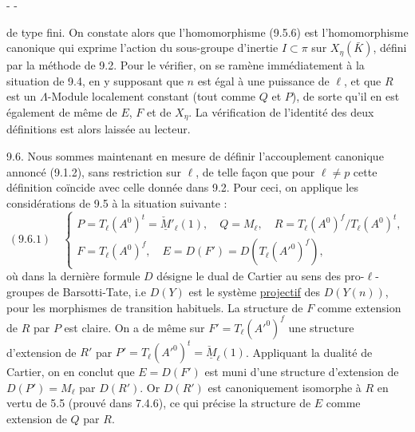 \begin{center}-  -\end{center}

de type fini. On constate alors que l'homomorphisme (9.5.6) est l'homomorphisme canonique qui exprime l'action du sous-groupe d'inertie $I\subset\pi$ sur $X_\eta(\bar K)$, défini par la méthode de 9.2. Pour le vérifier, on se ramène immédiatement à la situation de 9.4, en y supposant que $n$ est égal à une puissance de $\ell$, et que $R$ est un $\Lambda$-Module localement constant (tout comme $Q$ et $P$), de sorte qu'il en est également de même de $E$, $F$ et de $X_\eta$. La vérification de l'identité des deux définitions est alors laissée au lecteur.

9.6. Nous sommes maintenant en mesure de définir l'accouplement canonique annoncé (9.1.2), sans restriction sur $\ell$, de telle façon que pour $\ell\neq p$ cette définition coïncide avec celle donnée dans 9.2. Pour ceci, on applique les considérations de 9.5 à la situation suivante :
\[
(9.6.1)\quad\left\{\begin{array}{l}
P=T_\ell(A^0)^t=\check{\underline M}'_\ell(1),\quad Q=M_\ell,\quad R=T_\ell(A^0)^f/T_\ell(A^0)^t,\\[2em]
F=T_\ell(A^0)^f,\quad E=D(F')=D(T_\ell(A'^0)^f),
\end{array}\right.
\]
où dans la dernière formule $D$ désigne le dual de Cartier au sens des pro-$\ell$-groupes de Barsotti-Tate, i.e $D(Y)$ est le système \uline{projectif} des $D(Y(n))$, pour les morphismes de transition habituels. La structure de $F$ comme extension de $R$ par $P$ est claire. On a de même sur $F'=T_\ell(A'^0)^f$ une structure d'extension de $R'$ par $P'=T_\ell(A'^0)^t=\check{\underline M}_\ell(1)$. Appliquant la dualité de Cartier, on en conclut que $E=D(F')$ est muni d'une structure d'extension de $D(P')=M_\ell$ par $D(R')$. Or $D(R')$ est canoniquement isomorphe à $R$ en vertu de 5.5 (prouvé dans 7.4.6), ce qui précise la structure de $E$ comme extension de $Q$ par $R$.

